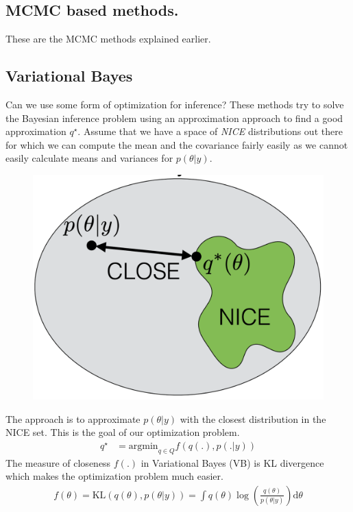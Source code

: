 \documentclass[10pt ]{article}
\begin{document}
\subsection{MCMC based methods.}
These are the MCMC methods explained earlier. 

\subsection{Variational Bayes}
Can we use some form of optimization for inference? These methods try to solve the Bayesian inference problem using an approximation approach to find a good approximation $q^{\star}$. Assume that we have a space of {\em NICE} distributions out there for which we can compute the mean and the covariance fairly easily as we cannot easily calculate means and variances for $p(\theta | y)$. 
\begin{figure}[h]
\center
\includegraphics[scale=0.3]{close.png}
\end{figure}
The approach is to approximate $p(\theta | y)$ with the closest distribution in the NICE set. This is the goal of our optimization problem. 
\begin{align}
q^{\star} &= \mathrm{argmin}_{q \in Q} f(q(.), p(.|y))
\label{eq_find_min_q}
\end{align}
The measure of closeness $f(.)$ in Variational Bayes (VB) is KL divergence which makes the optimization problem much easier. 
\begin{align}
f(\theta) = \mathrm{KL}(q(\theta), p(\theta|y)) = \int q(\theta) \log \left(\frac{q(\theta) }{p(\theta | y)} \right) \mathrm{d}\theta
\label{eq_kl_eq}
\end{align}
\end{document}

